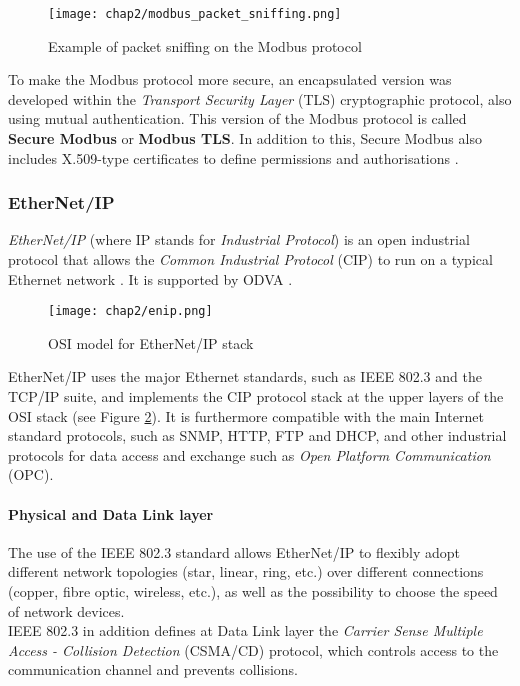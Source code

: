 \begin{figure}[ht]
	\centering
	\texttt{[image: chap2/modbus\_packet\_sniffing.png]}
	\caption{Example of packet sniffing on the Modbus protocol}
	\label{fig:modbus_packet_sniffing}
\end{figure}

To make the Modbus protocol more secure, an encapsulated version was developed within the \textit{Transport Security Layer} (TLS) cryptographic protocol, also using mutual authentication. This version of the Modbus protocol is called \textbf{Secure Modbus} or \textbf{Modbus TLS}. In addition to this, Secure Modbus also includes X.509-type certificates to define permissions and authorisations \cite{modbus_tls_pdf}.

\subsubsection{EtherNet/IP}
\label{subsub:enip}
\textit{EtherNet/IP} (where IP stands for \textit{Industrial Protocol}) is an open industrial protocol that allows the \textit{Common Industrial Protocol} (CIP) to run on a typical Ethernet network \cite{enip_pdf}. It is supported by ODVA \cite{odva_url}.

\begin{figure}[ht]
	\centering
	\texttt{[image: chap2/enip.png]}
	\caption{OSI model for EtherNet/IP stack}
	\label{fig:enip}
\end{figure}

EtherNet/IP uses the major Ethernet standards, such as IEEE 802.3 and the TCP/IP suite, and implements the CIP protocol stack at the upper layers of the OSI stack (see Figure \ref{fig:enip}). It is furthermore compatible with the main Internet standard protocols, such as SNMP, HTTP, FTP and DHCP, and other industrial protocols for data access and exchange such as \textit{Open Platform Communication} (OPC).

\bigskip
\paragraph{Physical and Data Link layer}

The use of the IEEE 802.3 standard allows EtherNet/IP to flexibly adopt different network topologies (star, linear, ring, etc.) over different connections (copper, fibre optic, wireless, etc.), as well as the possibility to choose the speed of network devices. \\
IEEE 802.3 in addition defines at Data Link layer the \textit{Carrier Sense Multiple Access - Collision Detection} (CSMA/CD) protocol, which controls access to the communication channel and prevents collisions.

